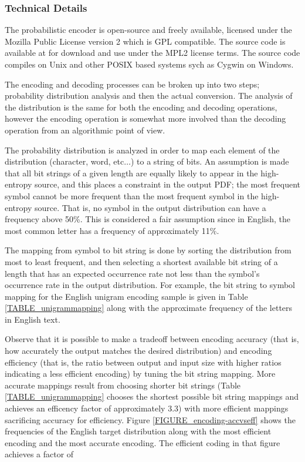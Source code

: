 \documentclass[12pt]{report}
\theoremstyle{remark}
\theoremstyle{definition}
\theoremstyle{definition}
\theoremstyle{definition}
\begin{document}
\begin{appendices}
\subsubsection{Technical Details} The probabilistic encoder is open-source and
freely available, licensed under the Mozilla Public License version 2 which is
GPL compatible. The source code is available at \cite{probcodesrc} for download
and use under the MPL2 license terms. The source code compiles on Unix and other
POSIX based systems sych as Cygwin on Windows.

The encoding and decoding processes can be broken up into two steps; probability
distribution analysis and then the actual conversion. The analysis of the
distribution is the same for both the encoding and decoding operations, however
the encoding operation is somewhat more involved than the decoding operation
from an algorithmic point of view.

The probability distribution is analyzed in order to map each element of the
distribution (character, word, etc$\ldots$) to a string of bits. An assumption
is made that all bit strings of a given length are equally likely to appear in
the high-entropy source, and this places a constraint in the output PDF; the
most frequent symbol cannot be more frequent than the most frequent symbol in
the high-entropy source. That is, no symbol in the output distribution can have
a frequency above 50\%. This is considered a fair assumption since in English,
the most common letter has a frequency of approximately 11\%.

The mapping from symbol to bit string is done by sorting the distribution from
most to least frequent, and then selecting a shortest available bit string of a
length that has an expected occurrence rate not less than the symbol's
occurrence rate in the output distribution. For example, the bit string to
symbol mapping for the English unigram encoding sample is given in Table
\ref{TABLE_unigrammapping} along with the approximate frequency of the letters
in English text.

Observe that it is possible to make a tradeoff between encoding accuracy (that
is, how accurately the output matches the desired distribution) and encoding
efficiency (that is, the ratio between output and input size with higher ratios
indicating a less efficient encoding) by tuning the bit string mapping. More
accurate mappings result from choosing shorter bit strings (Table
\ref{TABLE_unigrammapping} chooses the shortest possible bit string mappings and
achieves an efficency factor of approximately 3.3) with more efficient mappings
sacrificing accuracy for efficiency. Figure \ref{FIGURE_encoding-accvseff} shows
the frequencies of the English target distribution along with the most efficient
encoding and the most accurate encoding. The efficient coding in that figure
achieves a factor of


\end{appendices}
\end{document}
